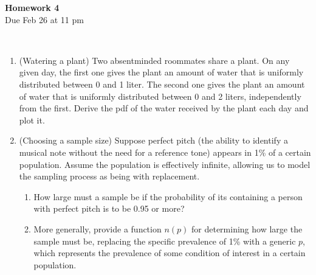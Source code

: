 \documentclass[12pt,twoside]{article}
\begin{document}
\begin{center}
{\large{\textbf{Homework 4}} } \vspace{0.2cm}\\
Due Feb 26 at 11 pm
\\
\end{center}
\\

\begin{enumerate}


\item (Watering a plant)
Two absentminded roommates share a plant. On any given day, the first one gives the plant an amount of water that is uniformly distributed between 0 and 1 liter. The second one gives the plant an amount of water that is uniformly distributed between 0 and 2 liters, independently from the first. Derive the pdf of the water received by the plant each day and plot it.

\item (Choosing a sample size)
Suppose perfect pitch (the ability to identify a musical note without the need for a reference tone) appears in 1\% of a certain population.   Assume the population is effectively infinite, allowing us to model the sampling process as being with replacement. 
\begin{enumerate}
\item How large must a sample be if the probability of its containing a person with perfect pitch is to be 0.95 or more? 
\item More generally, provide a function $n(p)$ for determining how large the sample must be, replacing the specific prevalence of 1\% with a generic $p$, which represents the prevalence of some condition of interest in a certain population. 
\end{enumerate}




\end{enumerate}
\end{document}
